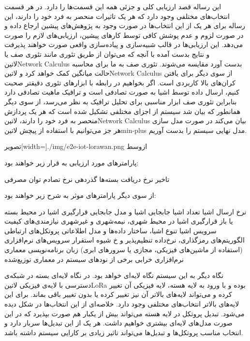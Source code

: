 این رساله قصد ارزیابی کلی و جزئی همه این قسمت‌ها را دارد. در هر قسمت انتخاب‌های مختلفی وجود دارد که هر یک تاثیرات منحصر به فرد خود را دارند،
این رساله برای هر یک از این انتخاب‌ها در صورت وجود به پژوهش‌های پیشین ارجاع داده و در صورت لزوم و عدم پوشش کافی توسط کارهای پیشین، ارزیابی‌های لازم را صورت می‌دهد.
این ارزیابی‌ها در قالب شبیه‌سازی و پیاده‌سازی واقعی صورت خواهند پذیرفت و نتایج بدست آمده با آنچه که می‌توان از طریق تئوری مانند تئوری صف یا ‌لاتین{Network Calculus}
بدست آورد مقایسه می‌شوند. تئوری صف به ما برای محاسبه حالت میانگین کمک خواهد کرد و ‌لاتین{Network Calculus} از سوی دیگر برای یافتن کران‌های بالا کاربردی است.
اگر بخواهیم در رابطه با ابزارهای تئوری دقیقتر صحبت کنیم، ارسال داده توسط اشیا به صورت تصادفی است و ترافیک ماهیت تصادفی دارد بنابراین تئوری صف ابزار مناسبی برای تحلیل ترافیک به نظر می‌رسد،
از سوی دیگر همانطور که بیان شد سیستم از اجزای مختلفی تشکیل شده است که هر یک پردازش منحصر به فرد خود را دارند، ‌لاتین{Network Calculus} بیان می‌کند در صورت مدل سازی هر جز
می‌توانیم با استفاده از پیچش ‌لاتین{min-plus} مدل نهایی سیستم را بدست آوریم.

‌تصویر[width=\textwidth]{./img/e2e-iot-lorawan.png}
‌ازوسط

پارامترهای مورد ارزیابی به قرار زیر خواهند بود:

 تاخیر
 نرخ دریافت بسته‌ها
 گذردهی
 نرخ تصادم
 توان مصرفی

از سوی دیگر پارامترهای موثر به شرح زیر خواهند بود:

 نرخ ارسال اشیا
 تعداد اشیا
 جابجایی اشیا و مدل جابجایی
 قرارگیری اشیا در محیط بسته یا باز
 قرارگیری اشیا در محیط شهری، نیمه‌شهری و غیرشهری
 نیازمندی‌های کیفیت سرویس اشیا
 تنوع اشیا، ساختار داده‌ها و مدل اطلاعاتی
 پروتکل‌های ارتباطی
 الگوریتم‌های رمزگذاری، نرخ‌داده تنظیم‌پذیر و ‌خ
 شیوه استقرار سرویس‌های نرم‌افزاری (استفاده از ماشین‌های فیزیکی، مجازی یا سرورهای ابری)
 زبان برنامه‌نویسی
 معماری نرم‌افزاری
 خرابی برخی از نودهای سیستم در معماری توزیع‌شده

نگاه دیگر به این سیستم نگاه لایه‌ای خواهد بود. در نگاه لایه‌ای بسته در شبکه‌ی دسترسی با لایه‌ی فیزیکی ‌لاتین{LoRa} بوده و با ورود به لایه هسته،
لایه فیزیکی آن تغییر کرده و می‌تواند لایه‌های بالاتر آن نیز تغییر کرده یا بدون تغییر باقی بماند. برای این لایه‌های بالاتر انتخاب‌های مختلفی وجود دارد.
خلاصه‌ای از این انتخاب‌ها در شکل  دیده می‌شود.
تبدیل پروتکل در لایه هسته می‌تواند بیش از یکبار هم صورت بپذیرد که در این صورت مدل‌های لایه‌ای بیشتری خواهیم داشت. هر یک از این تبدیل‌ها
سربار دارد و انتخاب مناسب پروتکل‌ها و تبدیل‌ها می‌تواند تاثیر زیادی بر کارایی سیستم داشته باشد.

